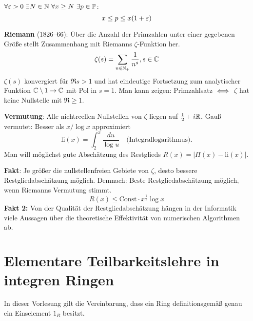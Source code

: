 \documentclass[a4paper,DIV15,BCOR12mm]{article}
\begin{document}
\begin{folgerung}
$\forall \ep > 0 \ \exists N\in\MdN \ \forall x\ge N \ \exists
p\in\MdP$:
\[ x \le p \le x(1+\varepsilon) \]
\end{folgerung}

\textbf{Riemann} (1826--66): \glqq Über die Anzahl der Primzahlen
unter einer gegebenen Größe\grqq{}  stellt Zusammenhang mit Riemanns
$\zeta$-Funktion her.
\[ \zeta(s) = \sum_{n\in\mathbb{N}_+} \frac{1}{n^s}, s\in\mathbb{C} \]
$\zeta(s)$ konvergiert für $\Re s>1$ und hat eindeutige Fortsetzung
zum analytischer Funktion $\mathbb{C}\setminus1\to\mathbb{C}$ mit Pol in $s=1$.
Man kann zeigen: Primzahlsatz $\iff$ $\zeta$ hat keine Nullstelle
mit $\Re \ge 1$.

\textbf{Vermutung}: Alle nichtreellen Nullstellen von $\zeta$ liegen
auf $\frac12+i\mathbb{R}$. Gauß vermutet: Besser als $x/\log x$
approximiert
\[ \text{li}(x) = \int_2^x \frac {du}{\log u} \quad \text{(Integrallogarithmus).} \]
Man will möglichst gute Abschätzung des Restglieds $R(x) = |\Pi(x) -
\text{li}(x)|$.

\textbf{Fakt}: Je größer die nullstellenfreien Gebiete von $\zeta$,
desto bessere Restgliedabschätzung möglich. Demnach: Beste
Restgliedabschätzung möglich, wenn Riemanns Vermutung stimmt.
\[ R(x) \le \text{Const} \cdot x^{\frac 12} \log x \]
\textbf{Fakt 2:} Von der Qualität der Restgliedabschätzung hängen in
der Informatik viele Aussagen über die theoretische Effektivität von
numerischen Algorithmen ab.

\section{Elementare Teilbarkeitslehre in integren Ringen}
In dieser Vorlesung gilt die Vereinbarung, dass ein Ring
definitionsgemäß genau ein Einselement $1_R$ besitzt.
\end{document}
